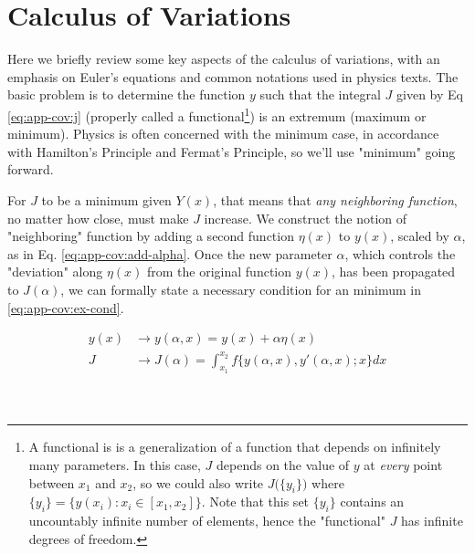 \newpage
\chapter{Calculus of Variations}
\label{app:calcvar}
Here we briefly review some key aspects of the calculus of variations, with an emphasis on Euler's equations and common notations used in physics texts. The basic problem is to determine the function $y$ such that the integral $J$ given by Eq \ref{eq:app-cov:j} (properly called a functional\footnote{A functional is is a generalization of a function that depends on infinitely many parameters. In this case, $J$ depends on the value of $y$ at \textit{every} point between $x_1$ and $x_2$, so we could also write $J\big(\{y_i\}\big)$ where $\{y_i\}=\{y(x_i):x_i\in[x_1, x_2]\}$. Note that this set $\{y_i\}$ contains an uncountably infinite number of elements, hence the "functional" $J$ has infinite degrees of freedom.}) is an extremum (maximum or minimum). Physics is often concerned with the minimum case, in accordance with Hamilton's Principle and Fermat's Principle, so we'll use "minimum" going forward. 



For $J$ to be a minimum given $Y(x)$, that means that \textit{any neighboring function}, no matter how close, must make $J$ increase. We construct the notion of "neighboring" function by adding a  second function $\eta(x)$ to $y(x)$, scaled by $\alpha$, as in Eq. \ref{eq:app-cov:add-alpha}. Once the new parameter $\alpha$, which controls the "deviation" along $\eta(x)$ from the original function $y(x)$, has been propagated to $J(\alpha)$, we can formally state a necessary condition for an minimum in \ref{eq:app-cov:ex-cond}. 

\begin{equation}
	\label{eq:app-cov:add-alpha}
	\begin{split}
		y(x) & \rightarrow y(\alpha, x) = y(x) + \alpha\eta(x) \\
		J & \rightarrow J(\alpha) = \int_{x_1}^{x_2}f\big\{y(\alpha, x), y'(\alpha, x); x\big\}dx \\
	\end{split}
\end{equation}

\


